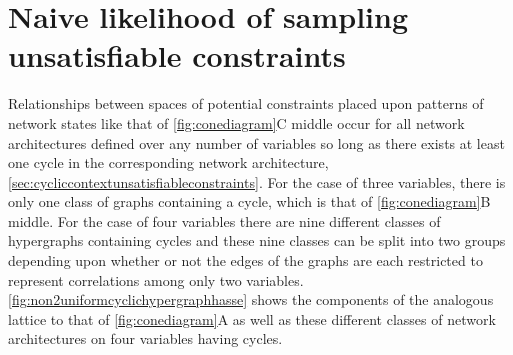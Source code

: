 \section{Naive likelihood of sampling unsatisfiable constraints}\label{sec:volrat}
Relationships between spaces of potential constraints placed upon patterns of network states like that of \ref{fig:conediagram}C middle occur for all network architectures defined over any number of variables so long as there exists at least one cycle in the corresponding network architecture, \ref{sec:cycliccontextunsatisfiableconstraints}. For the case of three variables, there is only one class of graphs containing a cycle, which is that of \ref{fig:conediagram}B middle. For the case of four variables there are nine different classes of hypergraphs containing cycles and these nine classes can be split into two groups depending upon whether or not the edges of the graphs are each restricted to represent correlations among only two variables. \ref{fig:non2uniformcyclichypergraphhasse} shows the components of the analogous lattice to that of \ref{fig:conediagram}A as well as these different classes of network architectures on four variables having cycles.

